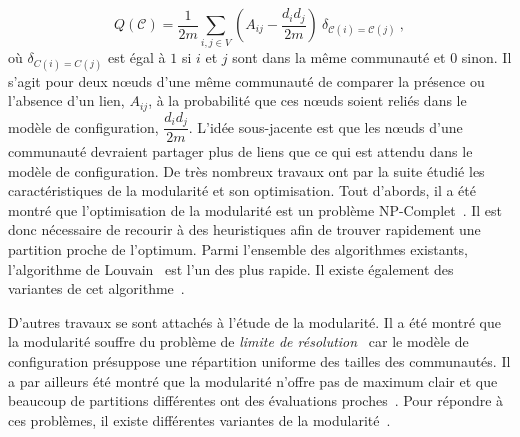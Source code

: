 \begin{equation}
Q(\mathcal{C}) = \dfrac{1}{2m}\sum_{i,j \in V} \left(A_{ij} - \dfrac{d_id_j}{2m}\right)\ \delta_{\mathcal{C}(i)=\mathcal{C}(j)} \ ,
\end{equation}
où $\delta_{C(i)=C(j)}$ est égal à $1$ si $i$ et $j$ sont dans la même communauté et $0$ sinon.
Il s'agit pour deux n\oe{}uds d'une même communauté de comparer la présence ou l'absence d'un lien, $A_{ij}$, à la probabilité que ces n\oe{}uds soient reliés dans le modèle de configuration, $\dfrac{d_id_j}{2m}$.
L'idée sous-jacente est que les n\oe{}uds d'une communauté devraient partager plus de liens que ce qui est attendu dans le modèle de configuration.
De très nombreux travaux ont par la suite étudié les caractéristiques de la modularité et son optimisation.
Tout d'abords, il a été montré que l'optimisation de la modularité est un problème NP-Complet~\cite{Brandes2007}.
Il est donc nécessaire de recourir à des heuristiques afin de trouver rapidement une partition proche de l'optimum.
Parmi l'ensemble des algorithmes existants, l'algorithme de Louvain~\cite{Blondel2008a} est l'un des plus rapide.
Il existe également des variantes de cet algorithme~\cite{Huang2015,Traag2015c}.

D'autres travaux se sont attachés à l'étude de la modularité.
Il a été montré que la modularité souffre du problème de \emph{limite de résolution}~\cite{Fortunato2007,Lancichinetti2011} car le modèle de configuration présuppose une répartition uniforme des tailles des communautés.
Il a par ailleurs été montré que la modularité n'offre pas de maximum clair et que beaucoup de partitions différentes ont des évaluations proches~\cite{Good2010}.
Pour répondre à ces problèmes, il existe différentes variantes de la modularité~\cite{Reichardt2006,Delvenne2010}.


